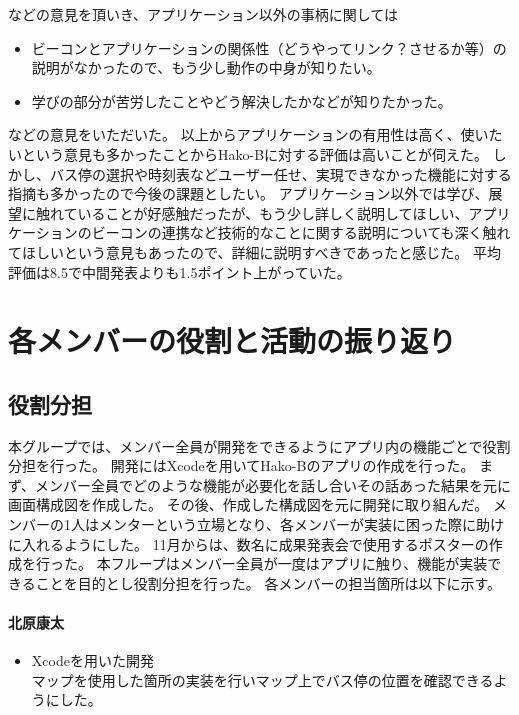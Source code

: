 \documentclass[openany,11pt,papersize]{jsbook}
\begin{document}
などの意見を頂いき、アプリケーション以外の事柄に関しては
\begin{itemize}

\item ビーコンとアプリケーションの関係性（どうやってリンク？させるか等）の説明がなかったので、もう少し動作の中身が知りたい。
\item 学びの部分が苦労したことやどう解決したかなどが知りたかった。

\end{itemize}
などの意見をいただいた。
以上からアプリケーションの有用性は高く、使いたいという意見も多かったことからHako-Bに対する評価は高いことが伺えた。
しかし、バス停の選択や時刻表などユーザー任せ、実現できなかった機能に対する指摘も多かったので今後の課題としたい。
アプリケーション以外では学び、展望に触れていることが好感触だったが、もう少し詳しく説明してほしい、アプリケーションのビーコンの連携など技術的なことに関する説明についても深く触れてほしいという意見もあったので、詳細に説明すべきであったと感じた。
平均評価は8.5で中間発表よりも1.5ポイント上がっていた。



\chapter{各メンバーの役割と活動の振り返り}
\section{役割分担}
本グループでは、メンバー全員が開発をできるようにアプリ内の機能ごとで役割分担を行った。
開発にはXcodeを用いてHako-Bのアプリの作成を行った。
まず、メンバー全員でどのような機能が必要化を話し合いその話あった結果を元に画面構成図を作成した。
その後、作成した構成図を元に開発に取り組んだ。
メンバーの1人はメンターという立場となり、各メンバーが実装に困った際に助けに入れるようにした。
11月からは、数名に成果発表会で使用するポスターの作成を行った。
本フループはメンバー全員が一度はアプリに触り、機能が実装できることを目的とし役割分担を行った。
各メンバーの担当箇所は以下に示す。

\subsubsection{北原康太}
\begin{itemize}
	\item Xcodeを用いた開発\\
    マップを使用した箇所の実装を行いマップ上でバス停の位置を確認できるようにした。
\end{itemize}
\end{document}
